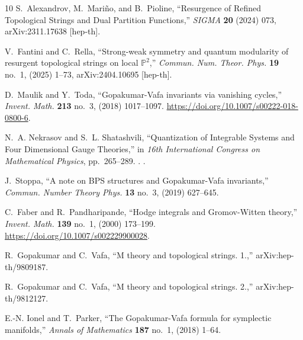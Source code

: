 \documentclass[a4paper,12pt,justification=centering]{article}
\numberwithin{equation}{section}
\providecommand{\href}[2]{#2}
\theoremstyle{plain}%
\theoremstyle{definition}
\begin{document}
\begin{thebibliography}{10}
S.~Alexandrov, M.~Mari{\~n}o, and B.~Pioline, ``{Resurgence of Refined
  Topological Strings and Dual Partition Functions},''
  \href{http://dx.doi.org/10.3842/SIGMA.2024.073}{{\em SIGMA} {\bfseries 20}
  (2024) 073}, \href{http://arxiv.org/abs/2311.17638}{{\ttfamily
  arXiv:2311.17638 [hep-th]}}.

V.~Fantini and C.~Rella, ``{Strong-weak symmetry and quantum modularity of
  resurgent topological strings on local $\mathbb{P}^2$},''
  \href{http://dx.doi.org/10.4310/cntp.250215002033}{{\em Commun. Num. Theor.
  Phys.} {\bfseries 19} no.~1, (2025) 1--73},
  \href{http://arxiv.org/abs/2404.10695}{{\ttfamily arXiv:2404.10695
  [hep-th]}}.

D.~Maulik and Y.~Toda, ``Gopakumar-{V}afa invariants via vanishing cycles,''
  \href{http://dx.doi.org/10.1007/s00222-018-0800-6}{{\em Invent. Math.}
  {\bfseries 213} no.~3, (2018) 1017--1097}.
  \url{https://doi.org/10.1007/s00222-018-0800-6}.

N.~A. Nekrasov and S.~L. Shatashvili,
  \href{http://dx.doi.org/10.1142/9789814304634_0015}{``{Quantization of
  Integrable Systems and Four Dimensional Gauge Theories},''} in {\em {16th
  International Congress on Mathematical Physics}}, pp.~265--289.
.
\newblock \href{http://arxiv.org/abs/0908.4052}{{\ttfamily arXiv:0908.4052
  [hep-th]}}.

J.~Stoppa, ``A note on {BPS} structures and {G}opakumar-{V}afa invariants,''
  {\em Commun. Number Theory Phys.} {\bfseries 13} no.~3, (2019) 627--645.

C.~Faber and R.~Pandharipande, ``Hodge integrals and {G}romov-{W}itten
  theory,'' \href{http://dx.doi.org/10.1007/s002229900028}{{\em Invent. Math.}
  {\bfseries 139} no.~1, (2000) 173--199}.
  \url{https://doi.org/10.1007/s002229900028}.

R.~Gopakumar and C.~Vafa, ``{M theory and topological strings. 1.},''
  \href{http://arxiv.org/abs/hep-th/9809187}{{\ttfamily arXiv:hep-th/9809187}}.

R.~Gopakumar and C.~Vafa, ``{M theory and topological strings. 2.},''
  \href{http://arxiv.org/abs/hep-th/9812127}{{\ttfamily arXiv:hep-th/9812127}}.

E.-N. Ionel and T.~Parker, ``{The Gopakumar-Vafa formula for symplectic
  manifolds},'' {\em Annals of Mathematics} {\bfseries 187} no.~1, (2018)
  1--64.


\end{thebibliography}
\end{document}
